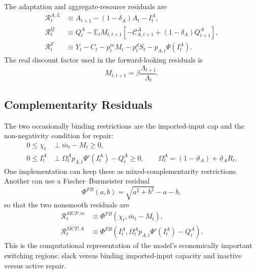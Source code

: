 ﻿\documentclass[12pt]{article}
\theoremstyle{remark}
\newcommand{\E}{\mathbb E}
\newcommand{\C}{\mathcal C}
\begin{document}
The adaptation and aggregate-resource residuals are
\begin{align}
    \mathcal R_t^{A,L}
    &\equiv
    A_{t+1}-(1-\delta_A)A_t-I_t^A,
    \label{eq:app_deqn_R_A_law}\\
    \mathcal R_t^Q
    &\equiv
    Q_t^A
    -
    \E_tM_{t,t+1}
    \left[
        -\C_{A,t+1}^{\Delta}
        +(1-\delta_A)Q_{t+1}^A
    \right],
    \label{eq:app_deqn_R_Q}\\
    \mathcal R_t^Y
    &\equiv
    Y_t-C_t-p_t^mM_t-p_t^dS_t-p_{A,t}\Psi(I_t^A).
    \label{eq:app_deqn_R_resource}
\end{align}
The real discount factor used in the forward-looking residuals is
\begin{equation}
    M_{t,t+1}=\beta\frac{\Lambda_{t+1}}{\Lambda_t}.
    \label{eq:app_deqn_sdf}
\end{equation}

\subsection{Complementarity Residuals}

The two occasionally binding restrictions are the imported-input cap and the non-negativity
condition for repair:
\begin{align}
    0\le \chi_t
    &\perp
    \bar m_t-M_t\ge0,
    \label{eq:app_deqn_m_mcp}\\
    0\le I_t^A
    &\perp
    \Omega_t^Ap_{A,t}\Psi'(I_t^A)-Q_t^A\ge0,
    \qquad
    \Omega_t^A=(1-\vartheta_A)+\vartheta_AR_t.
    \label{eq:app_deqn_I_mcp}
\end{align}
One implementation can keep these as mixed-complementarity restrictions. Another can use a
Fischer--Burmeister residual
\begin{equation}
    \Phi^{FB}(a,b)=\sqrt{a^2+b^2}-a-b,
    \label{eq:app_deqn_FB}
\end{equation}
so that the two nonsmooth residuals are
\begin{align}
    \mathcal R_t^{MCP,m}
    &\equiv
    \Phi^{FB}(\chi_t,\bar m_t-M_t),
    \label{eq:app_deqn_R_m_mcp}\\
    \mathcal R_t^{MCP,A}
    &\equiv
    \Phi^{FB}(I_t^A,\Omega_t^Ap_{A,t}\Psi'(I_t^A)-Q_t^A).
    \label{eq:app_deqn_R_A_mcp}
\end{align}
This is the computational representation of the model's economically important switching regions:
slack versus binding imported-input capacity and inactive versus active repair.
\end{document}
